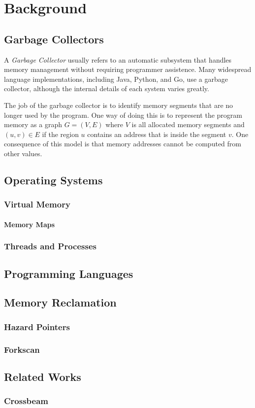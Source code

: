 \chapter{Background}


\section{Garbage Collectors}

A \emph{Garbage Collector} usually refers to an automatic subsystem that handles memory management
without requiring programmer assistence. Many widespread language implementations,
including Java, Python, and Go, use a garbage collector, although the internal details of each
system varies greatly.

The job of the garbage collector is to identify memory segments that are no longer used by the
program. One way of doing this is to represent the program memory as a graph $G=(V, E)$ where $V$ is
all allocated memory segments and $(u, v) \in E$ if the region $u$ contains an address that is
inside the segment $v$. One consequence of this model is that memory addresses cannot be computed
from other values.


\section{Operating Systems}
\blindtext{}

\subsection{Virtual Memory}
\blindtext{}

\subsubsection{Memory Maps\label{sec:memory-map}}
\blindtext{}


\subsection{Threads and Processes}
\blindtext{}


\section{Programming Languages}
\blindtext{}


\section{Memory Reclamation}
\blindtext{}

\subsection{Hazard Pointers\label{sec:hazard-pointers}}
\blindtext{}

\subsection{Forkscan\label{sec:forkscan}}
\blindtext{}


\section{Related Works}
\blindtext{}

\subsection{Crossbeam}
\blindtext{}
